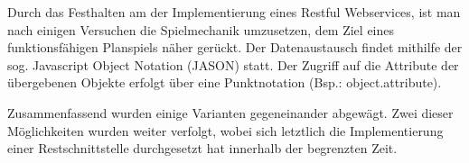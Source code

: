 Durch das Festhalten am der Implementierung eines Restful Webservices, ist man nach einigen Versuchen die Spielmechanik umzusetzen, dem Ziel eines funktionsfähigen Planspiels näher gerückt. Der Datenaustausch findet mithilfe der sog. Javascript Object Notation (JASON) statt. Der Zugriff auf die Attribute der übergebenen Objekte erfolgt über eine Punktnotation (Bsp.: object.attribute). 

Zusammenfassend wurden einige Varianten gegeneinander abgewägt. Zwei dieser Möglichkeiten wurden weiter verfolgt, wobei sich letztlich die Implementierung einer Restschnittstelle durchgesetzt hat innerhalb der begrenzten Zeit.